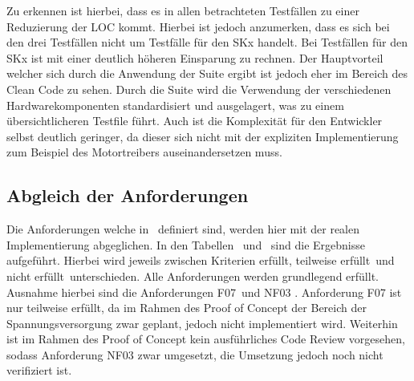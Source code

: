 Zu erkennen ist hierbei, dass es in allen betrachteten Testfällen zu einer Reduzierung der \ac{LOC} kommt. Hierbei ist jedoch anzumerken, dass es sich bei den drei Testfällen nicht um Testfälle für den SKx handelt. Bei Testfällen für den SKx ist mit einer deutlich höheren Einsparung zu rechnen.
Der Hauptvorteil welcher sich durch die Anwendung der Suite ergibt ist jedoch eher im Bereich des Clean Code zu sehen. Durch die Suite wird die Verwendung der verschiedenen Hardwarekomponenten standardisiert und ausgelagert, was zu einem übersichtlicheren Testfile führt. Auch ist die Komplexität für den Entwickler selbst deutlich geringer, da dieser sich nicht mit der expliziten Implementierung zum Beispiel des Motortreibers auseinandersetzen muss.
	\subsection{Abgleich der Anforderungen}
	Die Anforderungen welche in \dq {}\dq~definiert sind, werden hier mit der realen Implementierung abgeglichen. In den Tabellen \dq {}\dq~und \dq  {}\dq~sind die Ergebnisse aufgeführt. Hierbei wird jeweils zwischen Kriterien \dq erfüllt\dq, \dq teilweise erfüllt\dq~und \dq nicht erfüllt\dq~unterschieden. Alle Anforderungen werden grundlegend erfüllt. Ausnahme hierbei sind die Anforderungen \dq F07\dq~und \dq NF03 \dq. Anforderung F07 ist nur teilweise erfüllt, da im Rahmen des Proof of Concept der Bereich der Spannungsversorgung zwar geplant, jedoch nicht implementiert wird. Weiterhin ist im Rahmen des Proof of Concept kein ausführliches Code Review vorgesehen, sodass Anforderung NF03 zwar umgesetzt, die Umsetzung jedoch noch nicht verifiziert ist.
	
